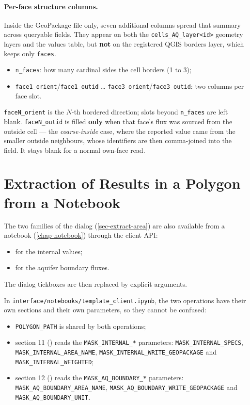 \paragraph{Per-face structure columns.} Inside the GeoPackage file only, seven additional columns spread that summary across queryable fields. They appear on both the \texttt{cells\_AQ\_layer<id>} geometry layers and the values table, but \textbf{not} on the registered QGIS borders layer, which keeps only \texttt{faces}.
\begin{itemize}
    \item \texttt{n\_faces}: how many cardinal sides the cell borders (1 to 3);
    \item \texttt{face1\_orient}/\texttt{face1\_outid} \dots{} \texttt{face3\_orient}/\texttt{face3\_outid}: two columns per face slot.
\end{itemize}
\texttt{faceN\_orient} is the $N$-th bordered direction; slots beyond \texttt{n\_faces} are left blank. \texttt{faceN\_outid} is filled \textbf{only} when that face's flux was sourced from the outside cell --- the \emph{coarse-inside} case, where the reported value came from the smaller outside neighbours, whose identifiers are then comma-joined into the field. It stays blank for a normal own-face read.


\section{Extraction of Results in a Polygon from a Notebook}
\label{sec-extract-notebook}
The two families of the  dialog (\cref{sec-extract-area}) are also available from a notebook (\cref{chap-notebook}) through the client API:
\begin{itemize}
    \item {} for the internal values;
    \item {} for the aquifer boundary fluxes.
\end{itemize}
The dialog tickboxes are then replaced by explicit arguments.

In \texttt{interface/notebooks/template\_client.ipynb}, the two operations have their own sections and their own parameters, so they cannot be confused:
\begin{itemize}
    \item \texttt{POLYGON\_PATH} is shared by both operations;
    \item section 11 () reads the \texttt{MASK\_INTERNAL\_*} parameters: \texttt{MASK\_INTERNAL\_SPECS}, \texttt{MASK\_INTERNAL\_AREA\_NAME}, \texttt{MASK\_INTERNAL\_WRITE\_GEOPACKAGE} and \texttt{MASK\_INTERNAL\_WEIGHTED};
    \item section 12 () reads the \texttt{MASK\_AQ\_BOUNDARY\_*} parameters: \texttt{MASK\_AQ\_BOUNDARY\_AREA\_NAME}, \texttt{MASK\_AQ\_BOUNDARY\_WRITE\_GEOPACKAGE} and \texttt{MASK\_AQ\_BOUNDARY\_UNIT}.
\end{itemize}

